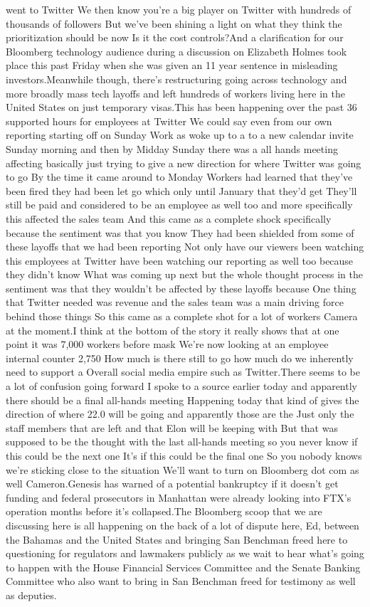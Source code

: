 \documentclass{article}%
\begin{document}
went to Twitter We then know you're a big player on Twitter with hundreds of thousands of followers But we've been shining a light on what they think the prioritization should be now Is it the cost controls?And a clarification for our Bloomberg technology audience during a discussion on Elizabeth Holmes took place this past Friday when she was given an 11 year sentence in misleading investors.Meanwhile though, there's restructuring going across technology and more broadly mass tech layoffs and left hundreds of workers living here in the United States on just temporary visas.This has been happening over the past 36 supported hours for employees at Twitter We could say even from our own reporting starting off on Sunday Work as woke up to a to a new calendar invite Sunday morning and then by Midday Sunday there was a all hands meeting affecting basically just trying to give a new direction for where Twitter was going to go By the time it came around to Monday Workers had learned that they've been fired they had been let go which only until January that they'd get They'll still be paid and considered to be an employee as well too and more specifically this affected the sales team And this came as a complete shock specifically because the sentiment was that you know They had been shielded from some of these layoffs that we had been reporting Not only have our viewers been watching this employees at Twitter have been watching our reporting as well too because they didn't know What was coming up next but the whole thought process in the sentiment was that they wouldn't be affected by these layoffs because One thing that Twitter needed was revenue and the sales team was a main driving force behind those things So this came as a complete shot for a lot of workers Camera at the moment.I think at the bottom of the story it really shows that at one point it was 7,000 workers before mask We're now looking at an employee internal counter 2,750 How much is there still to go how much do we inherently need to support a Overall social media empire such as Twitter.There seems to be a lot of confusion going forward I spoke to a source earlier today and apparently there should be a final all{-}hands meeting Happening today that kind of gives the direction of where 22.0 will be going and apparently those are the Just only the staff members that are left and that Elon will be keeping with But that was supposed to be the thought with the last all{-}hands meeting so you never know if this could be the next one It's if this could be the final one So you nobody knows we're sticking close to the situation We'll want to turn on Bloomberg dot com as well Cameron.Genesis has warned of a potential bankruptcy if it doesn't get funding and federal prosecutors in Manhattan were already looking into FTX's operation months before it's collapsed.The Bloomberg scoop that we are discussing here is all happening on the back of a lot of dispute here, Ed, between the Bahamas and the United States and bringing San Benchman freed here to questioning for regulators and lawmakers publicly as we wait to hear what's going to happen with the House Financial Services Committee and the Senate Banking Committee who also want to bring in San Benchman freed for testimony as well as deputies.%
\end{document}
